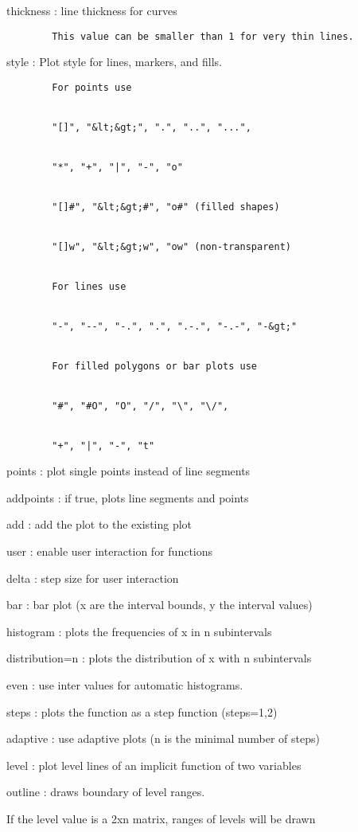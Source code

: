 \documentclass[
]{book}
\begin{document}
thickness : line thickness for curves

\begin{verbatim}
        This value can be smaller than 1 for very thin lines.
\end{verbatim}

style : Plot style for lines, markers, and fills.

\begin{verbatim}
        For points use


        "[]", "&lt;&gt;", ".", "..", "...",


        "*", "+", "|", "-", "o"


        "[]#", "&lt;&gt;#", "o#" (filled shapes)


        "[]w", "&lt;&gt;w", "ow" (non-transparent)


        For lines use


        "-", "--", "-.", ".", ".-.", "-.-", "-&gt;"


        For filled polygons or bar plots use


        "#", "#O", "O", "/", "\", "\/",


        "+", "|", "-", "t"
\end{verbatim}

points : plot single points instead of line segments

addpoints : if true, plots line segments and points

add : add the plot to the existing plot

user : enable user interaction for functions

delta : step size for user interaction

bar : bar plot (x are the interval bounds, y the interval values)

histogram : plots the frequencies of x in n subintervals

distribution=n : plots the distribution of x with n subintervals

even : use inter values for automatic histograms.

steps : plots the function as a step function (steps=1,2)

adaptive : use adaptive plots (n is the minimal number of steps)

level : plot level lines of an implicit function of two variables

outline : draws boundary of level ranges.

If the level value is a 2xn matrix, ranges of levels will be drawn
\end{document}
